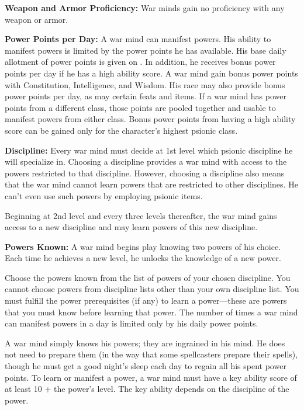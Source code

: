 {
\textbf{Weapon and Armor Proficiency:} War minds gain no proficiency with any weapon or armor.

\textbf{Power Points per Day:} A war mind can manifest powers. His ability to manifest powers is limited by the power points he has available. His base daily allotment of power points is given on . In addition, he receives bonus power points per day if he has a high ability score. A war mind gain bonus power points with Constitution, Intelligence, and Wisdom. His race may also provide bonus power points per day, as may certain feats and items. If a war mind has power points from a different class, those points are pooled together and usable to manifest powers from either class. Bonus power points from having a high ability score can be gained only for the character's highest psionic class.

\textbf{Discipline:} Every war mind must decide at 1st level which psionic discipline he will specialize in. Choosing a discipline provides a war mind with access to the powers restricted to that discipline. However, choosing a discipline also means that the war mind cannot learn powers that are restricted to other disciplines. He can't even use such powers by employing psionic items.

Beginning at 2nd level and every three levels thereafter, the war mind gains access to a new discipline and may learn powers of this new discipline.

\textbf{Powers Known:} A war mind begins play knowing two powers of his choice. Each time he achieves a new level, he unlocks the knowledge of a new power.

Choose the powers known from the list of powers of your chosen discipline. You cannot choose powers from discipline lists other than your own discipline list. You must fulfill the power prerequisites (if any) to learn a power---these are powers that you must know before learning that power. The number of times a war mind can manifest powers in a day is limited only by his daily power points.

A war mind simply knows his powers; they are ingrained in his mind. He does not need to prepare them (in the way that some spellcasters prepare their spells), though he must get a good night's sleep each day to regain all his spent power points. To learn or manifest a power, a war mind must have a key ability score of at least 10 + the power's level. The key ability depends on the discipline of the power.

}
